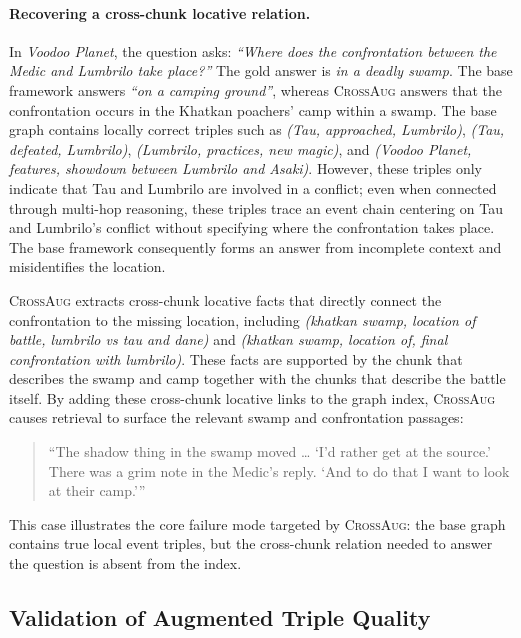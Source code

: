 \documentclass[11pt]{article}
\newcommand{\ours}{\textsc{CrossAug}\xspace}
\begin{document}
\paragraph{Recovering a cross-chunk locative relation.}
In \textit{Voodoo Planet}, the question asks: \textit{``Where does the confrontation between the Medic and Lumbrilo take place?''} The gold answer is \textit{in a deadly swamp}. The base framework answers \textit{``on a camping ground''}, whereas \ours answers that the confrontation occurs in the Khatkan poachers' camp within a swamp. The base graph contains locally correct triples such as \textit{(Tau, approached, Lumbrilo)}, \textit{(Tau, defeated, Lumbrilo)}, \textit{(Lumbrilo, practices, new magic)}, and \textit{(Voodoo Planet, features, showdown between Lumbrilo and Asaki)}. However, these triples only indicate that Tau and Lumbrilo are involved in a conflict; even when connected through multi-hop reasoning, these triples trace an event chain centering on Tau and Lumbrilo's conflict without specifying where the confrontation takes place. The base framework consequently forms an answer from incomplete context and misidentifies the location.

\ours extracts cross-chunk locative facts that directly connect the confrontation to the missing location, including \textit{(khatkan swamp, location of battle, lumbrilo vs tau and dane)} and \textit{(khatkan swamp, location of, final confrontation with lumbrilo)}. These facts are supported by the chunk that describes the swamp and camp together with the chunks that describe the battle itself. By adding these cross-chunk locative links to the graph index, \ours causes retrieval to surface the relevant swamp and confrontation passages:

\begin{quote}
\small
``The shadow thing in the swamp moved \ldots{} `I'd rather get at the source.' There was a grim note in the Medic's reply. `And to do that I want to look at their camp.'''
\end{quote}

This case illustrates the core failure mode targeted by \ours: the base graph contains true local event triples, but the cross-chunk relation needed to answer the question is absent from the index.

\subsection{Validation of Augmented Triple Quality}
\label{sec:deepseek-judge-validation}
\end{document}
